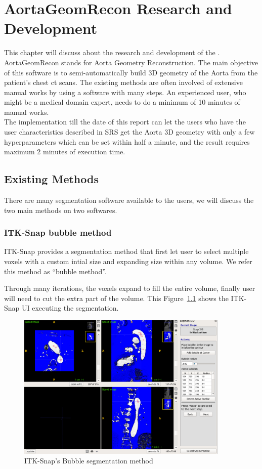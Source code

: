 \chapter{AortaGeomRecon Research and Development}
This chapter will discuss about the research and development of the \progname{}. \\
AortaGeomRecon stands for Aorta Geometry Reconstruction. The main objective of this software is to semi-automatically build 3D geometry of the Aorta from the patient's chest ct scans.  The existing methods are often involved of extensive manual works by using a software with many steps. An experienced user, who might be a medical domain expert, needs to do a minimum of 10 minutes of manual works. \\
The implementation till the date of this report can let the users who have the user characteristics described in SRS \citep{SRS} get the Aorta 3D geometry with only a few hyperparameters which can be set within half a minute, and the result requires maximum 2 minutes of execution time. \\


\section{Existing Methods}
There are many segmentation software available to the users, we will discuss the two main methods on two softwares.

\subsection{ITK-Snap bubble method} 
\indent
ITK-Snap provides a segmentation method that first let user to select multiple voxels with a custom intial size and expanding size within any volume. We refer this method as ``bubble method''.

Through many iterations, the voxels expand to fill the entire volume, finally user will need to cut the extra part of the volume. This Figure~\ref{fig_ITK} shows the ITK-Snap UI executing the segmentation.

\begin{figure}[ht]
    \centering
    \includegraphics[width=0.9\textwidth]{figures/AGR/bubbles.png}
    \caption[ITK-Snap's Bubble segmentation UI]{ITK-Snap's Bubble segmentation method}
    \label{fig_ITK}
\end{figure}

